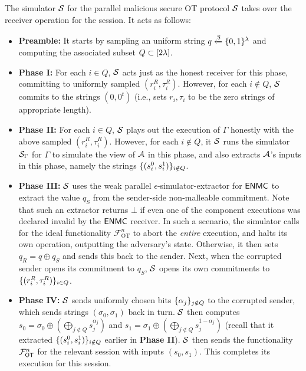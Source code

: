 \begin{AlgorithmBox}[label={fig:OT-Sim}]{The simulator $\mathcal{S}$ for the parallel malicious secure OT protocol}
 $\mathcal{S}$ takes over the receiver operation for the session. It acts as follows:  
\begin{itemize}
    \item {\bf Preamble:} It starts by sampling an uniform string $q \xleftarrow{\$} \{0,1\}^\lambda$ and computing the associated subset $Q \subset [2\lambda]$.
    \item {\bf Phase I:} For each $i \in Q$, $\mathcal{S}$ acts just as the honest receiver for this phase, committing to uniformly sampled $(r_i^R,\tau_i^R)$. However, for each $i \notin Q$, $\mathcal{S}$ commits to the strings $(0,0^t)$ (i.e., sets $r_i,\tau_i$ to be the zero strings of appropriate length).  
    \item {\bf Phase II:} For each $i \in Q$, $\mathcal{S}$ plays out the execution of $\Gamma$ honestly with the above sampled $(r_i^R,\tau_i^R)$. However, for each $i \notin Q$, it $\mathcal{S}$ runs the simulator $\mathcal{S}_\Gamma$ for $\Gamma$ to simulate the view of $\mathcal{A}$ in this phase, and also extracts $\mathcal{A}$'s inputs in this phase, namely the strings $\{(s_i^0,s_i^1)\}_{i \notin Q}$. 
    \item {\bf Phase III:} $\mathcal{S}$ uses the weak parallel $\epsilon$-simulator-extractor for $\mathsf{ENMC}$ to extract the value $q_S$ from the sender-side non-malleable commitment. Note that such an extractor returns $\bot$ if even one of the component executions was declared invalid by the $\mathsf{ENMC}$ receiver. In such a scenario, the simulator calls for the ideal functionality $\mathcal{F}^n_{\text{OT}}$ to abort the {\em entire} execution, and halts its own operation, outputting the adversary's state. 
    Otherwise, it then sets $q_R = q \oplus q_S$ and sends this back to the sender. Next, when the corrupted sender opens its commitment to $q_S$, $\mathcal{S}$ opens its own commitments to $\{(r_i^R,\tau_i^R)\}_{i \in Q}$. 
    \item {\bf Phase IV:} $\mathcal{S}$ sends uniformly chosen bits $\{\alpha_j\}_{j \notin Q}$ to the corrupted sender, which sends strings $(\sigma_0,\sigma_1)$ back in turn. $\mathcal{S}$ then computes $s_0 =  \sigma_0 \oplus (\bigoplus_{j \notin Q} s_j^{\alpha_j})$ and $s_1 =  \sigma_1 \oplus (\bigoplus_{j \notin Q} s_j^{1-\alpha_j})$ (recall that it extracted $\{(s_i^0,s_i^1)\}_{i \notin Q}$ earlier in {\bf Phase II}). $\mathcal{S}$ then sends the functionality $\mathcal{F}^n_\mathsf{OT}$ for the relevant session with inputs $(s_0,s_1)$. This completes its execution for this session. 
\end{itemize}


\end{AlgorithmBox}
